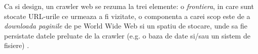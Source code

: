 Ca si design, un crawler web se rezuma la trei elemente: o \textit{frontiera}, in care sunt stocate URL-urile ce urmeaza a fi vizitate, o componenta a carei scop este de a \textit{downloada paginile} de pe World Wide Web si un spatiu de stocare, unde sa fie persistate datele preluate de la crawler (e.g. o baza de date si/sau un sistem de fisiere) \cite{Pantil, GautamPadminiFilippo}.
\\